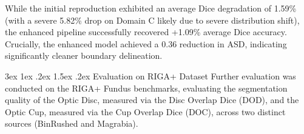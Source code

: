 \documentclass[journal,12pt,onecolumn,draftclsnofoot]{IEEEtran}
\makeatletter
\renewcommand{\subsection}{\@startsection{subsection}{2}{\z@}%
    {3ex \@plus 1ex \@minus .2ex}%
    {1.5ex \@plus.2ex}%
    {\normalfont\large\bfseries}}
\makeatother
\begin{document}
\begin{table}[htbp]
\centering
\caption{Prostate Dataset: Original, Reproduced, and Enhanced DAPSAM Performance}
\label{tab:dapsam_prostate}
\end{table}

While the initial reproduction exhibited an average Dice degradation of 1.59\% (with a severe 5.82\% drop on Domain C likely due to severe distribution shift), the enhanced pipeline successfully recovered +1.09\% average Dice accuracy. Crucially, the enhanced model achieved a 0.36 reduction in ASD, indicating significantly cleaner boundary delineation.

\subsection{Evaluation on RIGA+ Dataset}
Further evaluation was conducted on the RIGA+ Fundus benchmarks, evaluating the segmentation quality of the Optic Disc, measured via the Disc Overlap Dice (DOD), and the Optic Cup, measured via the Cup Overlap Dice (DOC), across two distinct sources (BinRushed and Magrabia). 
\end{document}
